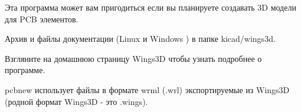 
Эта программа может вам пригодиться если вы планируете создавать 3D модели для PCB элементов.

Архив и файлы документации (Linux и Windows ) в папке kicad/wings3d.

Взгляните на домашнюю страницу Wings3D чтобы узнать подробнее о программе.

pcbnew использует файлы в формате wrml (.wrl) экспортируемые из Wings3D (родной формат Wings3D - это .wings).

